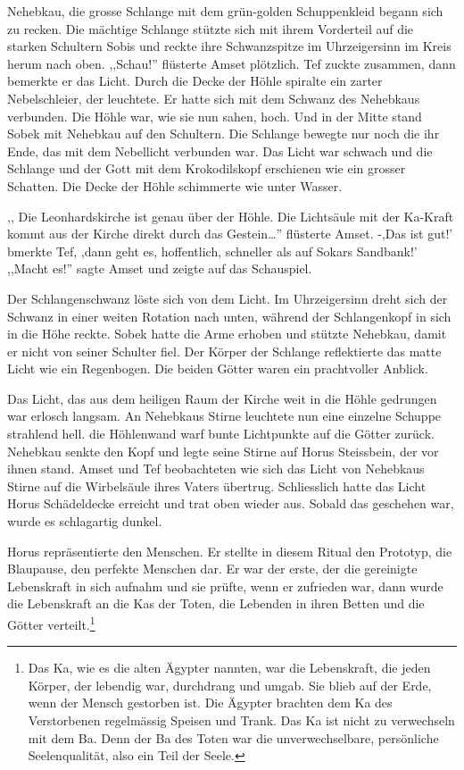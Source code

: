\documentclass[11pt,titlepage,a5paper]{book}
\begin{document}
Nehebkau, die grosse Schlange mit dem grün-golden Schuppenkleid begann sich zu recken. Die mächtige Schlange stützte sich mit ihrem Vorderteil auf die starken Schultern Sobis und reckte ihre Schwanzspitze im Uhrzeigersinn im Kreis herum nach oben. ,,Schau!'' flüsterte Amset plötzlich. Tef zuckte zusammen, dann bemerkte er das Licht. Durch die Decke der Höhle spiralte ein zarter Nebelschleier, der leuchtete. Er hatte sich mit dem Schwanz des Nehebkaus verbunden. Die Höhle war, wie sie nun sahen, hoch. Und in der Mitte stand Sobek mit Nehebkau auf den Schultern. Die Schlange bewegte nur noch die ihr Ende, das mit dem Nebellicht verbunden war.  Das Licht war schwach und die Schlange und der Gott mit dem Krokodilskopf erschienen wie ein grosser Schatten. Die Decke der Höhle schimmerte wie unter Wasser.

,, Die Leonhardskirche ist genau über der Höhle. Die Lichtsäule mit der Ka-Kraft kommt aus der Kirche direkt durch das Gestein\dots '' flüsterte Amset. -,Das ist gut!' bmerkte Tef, ,dann geht es, hoffentlich, schneller als auf Sokars Sandbank!' ,,Macht es!'' sagte Amset und zeigte auf das Schauspiel.

Der Schlangenschwanz löste sich von dem Licht. Im Uhrzeigersinn dreht sich der Schwanz in einer weiten Rotation nach unten, während der Schlangenkopf in sich in die Höhe reckte. Sobek hatte die Arme erhoben und stützte Nehebkau, damit er nicht von seiner Schulter fiel. Der Körper der Schlange reflektierte das matte Licht wie ein Regenbogen. Die beiden Götter waren ein prachtvoller Anblick.

Das Licht, das aus dem heiligen Raum der Kirche weit in die Höhle gedrungen war erlosch langsam. An Nehebkaus Stirne leuchtete nun eine einzelne Schuppe strahlend hell. die Höhlenwand warf bunte Lichtpunkte auf die Götter zurück. Nehebkau senkte den Kopf und legte seine Stirne auf Horus Steissbein, der vor ihnen stand. Amset und Tef beobachteten wie sich das Licht von Nehebkaus Stirne auf die Wirbelsäule ihres Vaters übertrug. Schliesslich hatte das Licht Horus Schädeldecke erreicht und trat oben wieder aus. Sobald das geschehen war, wurde es schlagartig dunkel.

Horus repräsentierte den Menschen. Er stellte in diesem Ritual den Prototyp, die Blaupause, den perfekte Menschen dar. Er war der erste, der die gereinigte Lebenskraft in sich aufnahm und sie prüfte, wenn er zufrieden war, dann wurde die Lebenskraft an die Kas der Toten, die Lebenden in ihren Betten und die Götter verteilt.\footnote{Das Ka, wie es die alten Ägypter nannten, war die Lebenskraft, die jeden Körper, der lebendig war, durchdrang und umgab. Sie blieb auf der Erde, wenn der Mensch gestorben ist. Die Ägypter brachten dem Ka des Verstorbenen regelmässig Speisen und Trank. Das Ka ist nicht zu verwechseln mit dem Ba. Denn der Ba des Toten war die unverwechselbare, persönliche Seelenqualität, also ein Teil der Seele.}
\end{document}
